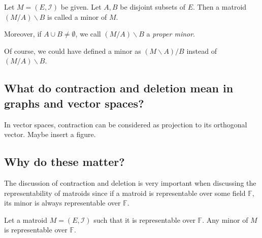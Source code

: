 \begin{defn}
Let $M = (E, \mathcal{I})$ be given.
Let $A, B$ be disjoint subsets of $E$.
Then a matroid $(M / A) \backslash B$ is called a minor of $M$.
\end{defn}

Moreover, if $A \cup B \neq \emptyset$, we call $(M / A) \backslash B$ a \textit{proper minor}.

Of course, we could have defined a minor as $(M \backslash A) / B$ instead of $(M / A) \backslash B$.


\subsection{What do contraction and deletion mean in graphs and vector spaces?}
In vector spaces, contraction can be considered as projection to its orthogonal vector.
Maybe insert a figure.

\subsection{Why do these matter?}
The discussion of contraction and deletion is very important when discussing the representability of matroids since if a matroid is representable over some field $\mathbb{F}$, its minor is always representable over $\mathbb{F}$.

\begin{thm}
Let a matroid $M = (E, \mathcal{I})$ such that it is representable over $\mathbb{F}$.
Any minor of $M$ is representable over $\mathbb{F}$.
\end{thm}

